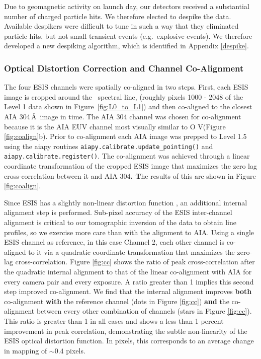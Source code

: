 \documentclass[linenumbers,trackchanges]{aastex63}
\begin{document}
Due to geomagnetic activity on launch day, our detectors received a substantial number of charged particle hits. 
We therefore elected to despike the data.
Available despikers were difficult to tune in such a way that they eliminated particle hits, but not small transient events (e.g.\ explosive events). We therefore developed a new despiking algorithm, which is identified in Appendix \ref{despike}.

        
\subsubsection{Optical Distortion Correction and Channel Co-Alignment}
   
  The four ESIS channels were spatially co-aligned in two steps.
First, each ESIS image is cropped around the \ov \ spectral line, (roughly pixels 1000 - 2048 of the Level 1 data shown in Figure~\ref{fig:L0_to_L1}) and then co-aligned to the closest AIA 304\,\AA\ image in time.  
The AIA 304 channel was chosen for co-alignment because it is the AIA EUV channel most visually similar to O V(Figure \ref{fig:coalign}b).
Prior to co-alignment each AIA image was prepped to Level 1.5 using the aiapy routines \texttt{aiapy.calibrate.update\_pointing()} and \texttt{aiapy.calibrate.register()}.
The co-alignment was achieved through a linear coordinate transformation of the cropped ESIS image that maximizes the zero lag cross-correlation between it and AIA 304\textbf{. T}he results of this are shown in Figure \ref{fig:coalign}.

Since ESIS has a slightly non-linear distortion function \citep{ESIS}, an additional internal alignment step is performed. 
Sub-pixel accuracy of the ESIS inter-channel alignment is critical to our tomographic inversion of the data to obtain line profiles, so we exercise more care than with the alignment to AIA.
Using a single ESIS channel as reference, in this case Channel 2, each other channel is co-aligned to it via a quadratic coordinate transformation that maximizes the zero-lag cross-correlation. 
Figure \ref{fig:cc} shows the ratio of peak cross-correlation after the quadratic internal alignment to that of the linear co-alignment with AIA for every camera pair and every exposure.
A ratio greater than 1 implies this second step improved co-alignment.
We find that the internal alignment improves \textbf{both} co-alignment \textbf{with} the reference channel (dots in Figure \ref{fig:cc}) \textbf{and} the co-alignment between every other combination of channels (stars in Figure \ref{fig:cc}).
This ratio is greater than 1 in all cases and shows a less than 1 percent improvement in peak correlation, demonstrating the subtle non-linearity of the ESIS optical distortion function.
In pixels, this corresponds to an average change in mapping of $\sim 0.4$ pixels.
\end{document}
